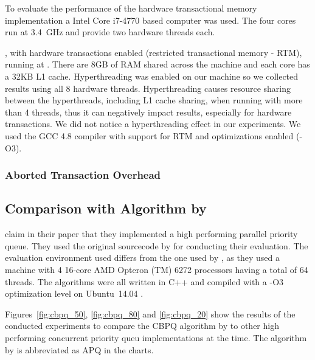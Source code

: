 To evaluate the performance of the hardware transactional memory implementation a Intel Core i7-4770 based computer was used. The four cores run at 3.4~GHz and provide two hardware threads each.

, with hardware transactions enabled (restricted transactional memory - RTM),
running at . There are 8GB of RAM shared across the machine and each core has a 32KB L1
cache. Hyperthreading was enabled on our machine so we collected results using all 8 hardware threads.
Hyperthreading causes resource sharing between the hyperthreads, including L1 cache sharing, when running
with more than 4 threads, thus it can negatively impact results, especially for hardware transactions. We
did not notice a hyperthreading effect in our experiments. We used the GCC 4.8 compiler with support for
RTM and optimizations enabled (-O3).

\subsubsection{Aborted Transaction Overhead}

\subsection{Comparison with Algorithm by \citeauthor{braginsky_cbpq:_2016}}

\citeauthor{braginsky_cbpq:_2016} claim in their paper that they implemented a high performing parallel priority queue. They used the original sourcecode by \citeauthor{calciu_adaptive_2014} for conducting their evaluation. The evaluation environment used differs from the one used by \citeauthor{calciu_adaptive_2014}, as they used a machine with 4 16-core AMD Opteron (TM) 6272 processors having a total of 64 threads. The algorithms were all written in C++ and compiled with a -O3 optimization level on Ubuntu~14.04 \cite{braginsky_cbpq:_2016}.

Figures~\ref{fig:cbpq_50}, \ref{fig:cbpq_80} and \ref{fig:cbpq_20} show the results of the conducted experiments to compare the CBPQ algorithm by \citeauthor{braginsky_cbpq:_2016} to other high performing concurrent priority queu implementations at the time. The algorithm by \citeauthor{calciu_adaptive_2014} is abbreviated as APQ in the charts.


